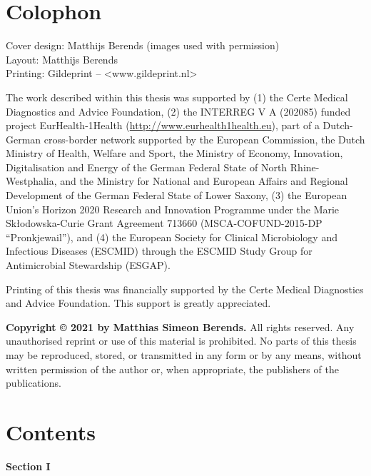 \documentclass[
]{book}
\begin{document}
\hypertarget{colophon}{%
\chapter*{Colophon}\label{colophon}}

Cover design: Matthijs Berends (images used with permission)\\
Layout: Matthijs Berends\\
Printing: Gildeprint -- \textless www.gildeprint.nl\textgreater{}

The work described within this thesis was supported by (1) the Certe Medical Diagnostics and Advice Foundation, (2) the INTERREG V A (202085) funded project EurHealth-1Health (\url{http://www.eurhealth1health.eu}), part of a Dutch-German cross-border network supported by the European Commission, the Dutch Ministry of Health, Welfare and Sport, the Ministry of Economy, Innovation, Digitalisation and Energy of the German Federal State of North Rhine-Westphalia, and the Ministry for National and European Affairs and Regional Development of the German Federal State of Lower Saxony, (3) the European Union's Horizon 2020 Research and Innovation Programme under the Marie Skłodowska-Curie Grant Agreement 713660 (MSCA-COFUND-2015-DP ``Pronkjewail''), and (4) the European Society for Clinical Microbiology and Infectious Diseases (ESCMID) through the ESCMID Study Group for Antimicrobial Stewardship (ESGAP).

Printing of this thesis was financially supported by the Certe Medical Diagnostics and Advice Foundation. This support is greatly appreciated.

\textbf{Copyright © 2021 by Matthias Simeon Berends.} All rights reserved. Any unauthorised reprint or use of this material is prohibited. No parts of this thesis may be reproduced, stored, or transmitted in any form or by any means, without written permission of the author or, when appropriate, the publishers of the publications.

\hypertarget{contents}{%
\chapter*{Contents}\label{contents}}

\textbf{Section I}
\end{document}
